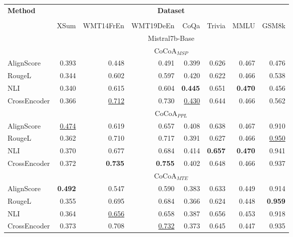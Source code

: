 
\begin{table*}[h!]
\footnotesize
\centering

\begin{tabular}{lrrrrrrr}
\toprule
    \multirow{2}{*}{\textbf{Method}}  & \multicolumn{7}{c}{\textbf{Dataset}}  \\ 
      \cmidrule(lr){2-8}  \\
  & XSum & WMT14FrEn & WMT19DeEn & CoQa & Trivia & MMLU & GSM8k \\
  \midrule

\rowcolor[gray]{0.9} & \multicolumn{7}{c}{Mistral7b-Base} \\

\midrule

& \multicolumn{7}{c}{$\text{CoCoA}_{MSP}$}\\
\midrule

AlignScore & 0.393& 0.448& 0.491& 0.399& 0.626& 0.467& 0.476\\
RougeL & 0.344& 0.602& 0.597& 0.420& 0.622& 0.466& 0.538\\
NLI & 0.340& 0.615& 0.604& \textbf{0.445}& 0.651& \textbf{0.470}& 0.456\\
CrossEncoder & 0.366& \underline{0.712}& 0.730& \underline{0.430}& 0.644& 0.466& 0.562\\

\midrule

& \multicolumn{7}{c}{$\text{CoCoA}_{PPL}$}\\
\midrule

AlignScore & \underline{0.474}& 0.619& 0.657& 0.408& 0.638& 0.467& 0.910\\
RougeL & 0.362& 0.710& 0.717& 0.391& 0.627& 0.466& \underline{0.950}\\
NLI & 0.370& 0.677& 0.684& 0.414& \textbf{0.657}& \textbf{0.470}& 0.941\\
CrossEncoder & 0.372& \textbf{0.735}& \textbf{0.755}& 0.402& 0.648& 0.466& 0.937\\

\midrule

& \multicolumn{7}{c}{$\text{CoCoA}_{MTE}$}\\
\midrule

AlignScore & \textbf{0.492}& 0.547& 0.590& 0.383& 0.633& 0.449& 0.914\\
RougeL & 0.355& 0.695& 0.684& 0.366& 0.624& 0.448& \textbf{0.959}\\
NLI & 0.364& \underline{0.656}& 0.658& 0.387& 0.656& 0.453& 0.918\\
CrossEncoder & 0.373& 0.708& \underline{0.732}& 0.373& 0.645& 0.447& 0.935\\
\midrule


\end{tabular}
\end{table*}
